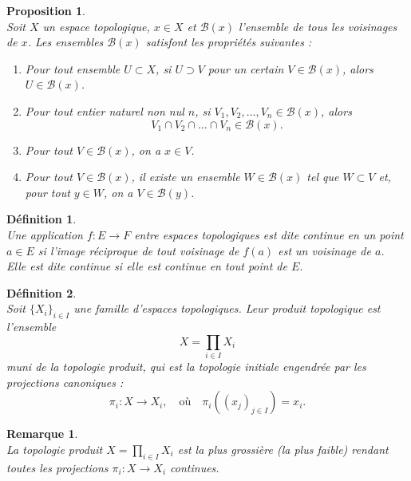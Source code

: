 \documentclass[a4paper, 14pt]{report}
\newtheorem{definition}{Définition}[section]
\newtheorem{remark}{Remarque}[section]
\newtheorem{proposition}{Proposition}[section]
\begin{document}
\begin{onehalfspace}
{\begin{proposition} \cite{bourbaki2013general} \\
Soit \( X \) un espace topologique, \( x \in X \) et \( \mathcal{B}(x) \) l'ensemble de tous les voisinages de \( x \). Les ensembles \( \mathcal{B}(x) \) satisfont les propriétés suivantes :
	\begin{enumerate}
		\item[(V$_1$)] Pour tout ensemble \( U \subset X \), si \( U \supset V \) pour un certain \( V \in \mathcal{B}(x) \), alors \( U \in \mathcal{B}(x) \).
		\item[(V$_2$)] Pour tout entier naturel non nul \( n \), si \( V_1, V_2, \dots, V_n \in \mathcal{B}(x) \), alors \[ V_1 \cap V_2 \cap \dots \cap V_n \in \mathcal{B}(x) .\]
		\item[(V$_3$)] Pour tout \( V \in \mathcal{B}(x) \), on a \( x \in V \).
		\item[(V$_4$)] Pour tout \( V \in \mathcal{B}(x) \), il existe un ensemble \( W \in \mathcal{B}(x) \) tel que \( W \subset V \) et, pour tout \( y \in W \), on a \( V \in \mathcal{B}(y) \).
	\end{enumerate}
\end{proposition}


\begin{definition} \cite{bourbaki2013general} \\
Une application \( f : E \to F \) entre espaces topologiques est dite continue en un point \( a \in E \) si l'image réciproque de tout voisinage de \( f(a) \) est un voisinage de \( a \).\\
Elle est dite continue si elle est continue en tout point de \( E \).
\end{definition}


\begin{definition} \cite{bourbaki2013general}\\
Soit \(\{X_i\}_{i \in I}\) une famille d'espaces topologiques. Leur produit topologique est l'ensemble  
\[
X = \prod_{i \in I} X_i
\]
muni de la topologie produit, qui est la topologie initiale engendrée par les projections canoniques :
\[
\pi_i : X \to X_i, \quad \text{où} \quad \pi_i((x_j)_{j \in I}) = x_i.
\]
\end{definition}

\begin{remark} \cite{bourbaki2013general}\\
La topologie produit \(X = \prod_{i \in I} X_i \) est la plus grossière (la plus faible) rendant toutes les projections \(\pi_i : X \to X_i\) continues.
\end{remark}

}
\end{onehalfspace}
\end{document}
